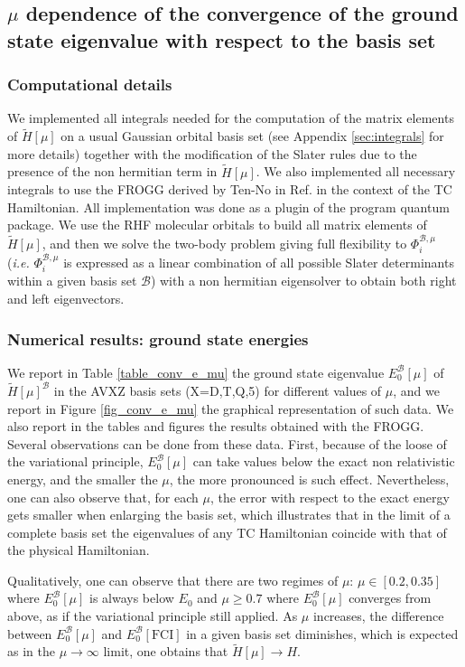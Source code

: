 \documentclass[aip,jcp,reprint,noshowkeys,superscriptaddress]{revtex4-1}
\newcommand{\phiimub}[0]{\Phi^{\mathcal{B},\mu}_i}
\newcommand{\basis}[0]{\mathcal{B}}
\begin{document}
\subsection{$\mu$ dependence of the convergence of the ground state eigenvalue with respect to the basis set }
\subsubsection{Computational details}
We implemented all integrals needed for the computation of the matrix elements of $\tilde{H}[\mu]$ on a usual Gaussian orbital basis set (see Appendix \ref{sec:integrals} for more details) together with the modification of the Slater rules due to the presence of the non hermitian term in $\tilde{H}[\mu]$. We also implemented all necessary integrals to use the FROGG derived by Ten-No in Ref.  in the context of the TC Hamiltonian.  
All implementation was done as a plugin of the program quantum package\cite{QP2}. 
We use the RHF molecular orbitals to build all matrix elements of $\tilde{H}[\mu]$, and then we solve the two-body problem giving full flexibility to $\phiimub$ (\textit{i.e.} $\phiimub$ is expressed as a linear combination of all possible Slater determinants within a given basis set $\basis$) with a non hermitian eigensolver to obtain both right and left eigenvectors. 

\subsubsection{Numerical results: ground state energies}
\label{sec:total_e}
We report in Table \ref{table_conv_e_mu} the ground state eigenvalue $E_0^{\basis}[\mu]$ of $\tilde{H}[\mu]^{\basis}$ in the AVXZ basis sets (X=D,T,Q,5) for different values of $\mu$, and we report in Figure \ref{fig_conv_e_mu} the graphical representation of such data. We also report in the tables and figures the results obtained with the FROGG. 
Several observations can be done from these data. First, because of the loose of the variational principle, $E_0^{\basis}[\mu]$ can take values below the exact non relativistic energy, and the smaller the $\mu$, the more pronounced is such effect. 
Nevertheless, one can also observe that, for each $\mu$, the error with respect to the exact energy gets smaller  
when enlarging the basis set, which illustrates that in the limit of a complete basis set the eigenvalues of any TC Hamiltonian coincide with that of the physical Hamiltonian. 

Qualitatively, one can observe that there are two regimes of $\mu$: $\mu \in[0.2,0.35]$ where $E_0^{\basis}[\mu]$ is always below $E_0$ and $\mu\ge 0.7$ where $E_0^{\basis}[\mu]$ converges from above, as if the variational principle still applied. 
As $\mu$ increases, the difference between $E_0^{\basis}[\mu]$ and $E_0^{\basis}[\text{FCI}]$ in a given basis set diminishes, 
which is expected as in the $\mu \rightarrow \infty$ limit, one obtains that  $\tilde{H}[\mu] \rightarrow H$. 
\end{document}
